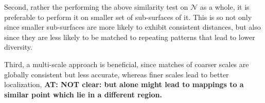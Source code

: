 \documentclass[10pt,twocolumn,letterpaper]{article}
\newcommand{\colornote}[3]{{\color{#1}\bf{#2: #3}\normalfont}}
\newcommand{\colornote}[3]{}
\newcommand {\ayellet}[1]{\colornote{blue}{AT}{#1}}
\begin{document}
Second, rather the performing the above similarity test on $\mathcal{N}$ as a whole, it is preferable to perform it on smaller set of sub-surfaces of it.
This is so not only since smaller sub-surfaces are more likely to exhibit consistent distances, but also since they are less likely to be matched to repeating patterns that lead to lower diversity.

Third, a multi-scale approach is beneficial, since matches of coarser scales are globally consistent but less accurate, whereas finer scales lead to better localization, \ayellet{NOT clear: but alone might lead to mappings to a similar point which lie in a different region.}
\end{document}
